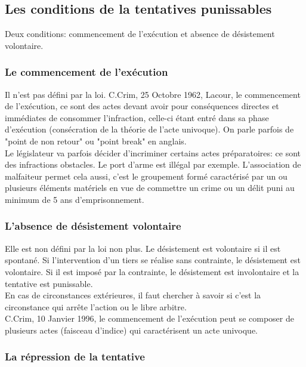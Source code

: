 \documentclass[10pt, a4paper, openany]{book}
\begin{document}
\subsection{Les conditions de la tentatives punissables}

Deux conditions: commencement de l'exécution et absence de désistement volontaire. 

\subsubsection{Le commencement de l'exécution}

Il n'est pas défini par la loi. C.Crim, 25 Octobre 1962, Lacour, le commencement de l'exécution, ce sont des actes devant avoir pour conséquences directes et immédiates de consommer l'infraction, celle-ci étant entré dans sa phase d'exécution (consécration de la théorie de l'acte univoque). On parle parfois de "point de non retour" ou "point break" en anglais. \\
Le législateur va parfois décider d'incriminer certains actes préparatoires: ce sont des infractions obstacles. Le port d'arme est illégal par exemple. L'association de malfaiteur permet cela aussi, c'est le groupement formé caractérisé par un ou plusieurs éléments matériels en vue de commettre un crime ou un délit puni au minimum de 5 ans d'emprisonnement.

\subsubsection{L'absence de désistement volontaire}

Elle est non défini par la loi non plus. Le désistement est volontaire si il est spontané. Si l'intervention d'un tiers se réalise sans contrainte, le désistement est volontaire. Si il est imposé par la contrainte, le désistement est involontaire et la tentative est punissable. \\
En cas de circonstances extérieures, il faut chercher à savoir si c'est la circonstance qui arrête l'action ou le libre arbitre. \\
C.Crim, 10 Janvier 1996, le commencement de l'exécution peut se composer de plusieurs actes (faisceau d'indice) qui caractérisent un acte univoque.  

\subsubsection{La répression de la tentative}
\end{document}

